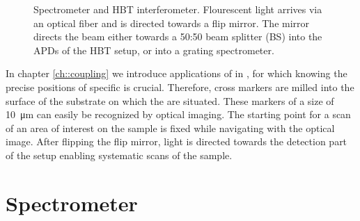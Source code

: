 		\begin{figure}[htb]
			\centering
			\caption[Spectrometer and HBT setup]{Spectrometer and HBT interferometer. Flourescent light arrives via an optical fiber and is directed towards a flip mirror. The mirror directs the beam either towards a 50:50 beam splitter (BS) into the APDs of the HBT setup, or into a grating spectrometer.}
			\label{fig::hbt_spectrometer}
		\end{figure}

		In chapter \autoref{ch::coupling} we introduce applications of \sivs in \nds, for which knowing the precise positions of specific \nds is crucial.
		Therefore, cross markers are milled into the surface of the substrate on which the \nds are situated.
		These markers of a size of \SI{10}{\micro\meter} can easily be recognized by optical imaging.
		The starting point for a scan of an area of interest on the sample is fixed while navigating with the optical image.
		After flipping the flip mirror, light is directed towards the detection part of the setup enabling systematic scans of the sample.

	\section{Spectrometer} \label{sec::methods_spectrometer}

